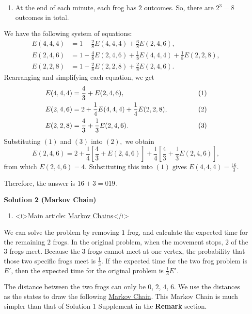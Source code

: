 \begin{enumerate}
\begin{enumerate}
        \item At the end of each minute, each frog has $2$ outcomes. So, there are $2^3=8$ outcomes in total.

            \end{enumerate}
            We have the following system of equations:
 \begin{align*} E(4,4,4)&=1+\frac{2}{8}E(4,4,4)+\frac{6}{8}E(2,4,6), \\ E(2,4,6)&=1+\frac{4}{8}E(2,4,6)+\frac{1}{8}E(4,4,4)+\frac{1}{8}E(2,2,8), \\ E(2,2,8)&=1+\frac{2}{8}E(2,2,8)+\frac{2}{8}E(2,4,6). \end{align*}
Rearranging and simplifying each equation, we get
 \begin{align*} E(4,4,4)&=\frac{4}{3}+E(2,4,6), &(1) \\ E(2,4,6)&=2+\frac{1}{4}E(4,4,4)+\frac{1}{4}E(2,2,8), &\hspace{12.75mm}(2) \\ E(2,2,8)&=\frac{4}{3}+\frac{1}{3}E(2,4,6). &(3) \end{align*}
Substituting $(1)$ and $(3)$ into $(2),$ we obtain 
 \[E(2,4,6)=2+\frac{1}{4}\left[\frac{4}{3}+E(2,4,6)\right]+\frac{1}{4}\left[\frac{4}{3}+\frac{1}{3}E(2,4,6)\right],\] from which $E(2,4,6)=4.$ Substituting this into $(1)$ gives $E(4,4,4)=\frac{16}{3}.$

 Therefore, the answer is $16+3=\boxed{019}.$




\textbf{Solution 2 (Markov Chain)}


            \begin{enumerate}[label=(\roman*)]
                \item <i>Main article: \href{https://artofproblemsolving.com/wiki/index.php?title=Markov\_Chains}{Markov Chains}</i>
            \end{enumerate}
            We can solve the problem by removing $1$ frog, and calculate the expected time for the remaining $2$ frogs. In the original problem, when the movement stops, $2$ of the $3$ frogs meet. Because the $3$ frogs cannot meet at one vertex, the probability that those two specific frogs meet is $\frac13$. If the expected time for the two frog problem is $E'$, then the expected time for the original problem is $\frac 13 E'$.

 The distance between the two frogs can only be $0$, $2$, $4$, $6$. We use the distances as the states to draw the following \href{https://en.wikipedia.org/wiki/Markov\_chain}{Markov Chain}. This Markov Chain is much simpler than that of Solution 1 Supplement in the \textbf{Remark} section.


\end{enumerate}
